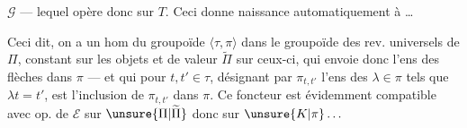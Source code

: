 $\mathcal G$ --- lequel opère donc sur $T$. Ceci donne naissance automatiquement à
\ldots

Ceci dit, on a un hom du groupoïde $\langle\tau,\pi\rangle$ dans le groupoïde des rev. universels de $\Pi$, constant sur les objets et de valeur $\widetilde\Pi$ sur ceux-ci, qui envoie donc l'ens des flèches dans $\pi$ --- et qui pour $t,t'\in\tau$, désignant par $\pi_{t,t'}$  l'ens des $\lambda\in\pi$ tels que $\lambda t=t'$, est l'inclusion de $\pi_{t,t'}$ dans $\pi$. Ce foncteur
est évidemment compatible avec op. de $\mathcal E$ sur $\unsure{\Pi|\widetilde\Pi}$ donc sur $\unsure{K|\pi}\ldots$
